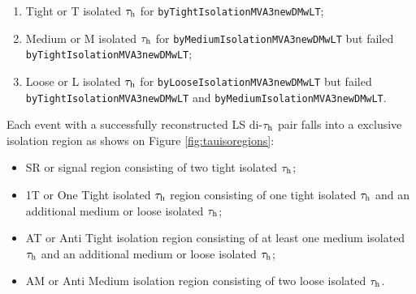  	
 	\begin{enumerate}
 		\item Tight or T isolated $\tau_{\text{h}}$ for \texttt{byTight\-IsolationMVA3newDMwLT};
 		\item Medium or M isolated $\tau_{\text{h}}$ for \texttt{byMedium\-IsolationMVA3newDMwLT} but failed \texttt{byTight\-IsolationMVA3newDMwLT};
 		\item Loose or L isolated $\tau_{\text{h}}$  for \texttt{byLoose\-IsolationMVA3newDMwLT} but failed \texttt{byTight\-IsolationMVA3newDMwLT} and \texttt{byMedium\-IsolationMVA3newDMwLT}.
 	\end{enumerate}
 	
Each event with a successfully reconstructed LS di-$\tau_{\text{h}}$ pair falls into a exclusive isolation region as shows on Figure \ref{fig:tauisoregions}:
 	
 	\begin{itemize}
 		\item SR or signal region consisting of two tight isolated $\tau_{\text{h}}$;
 		\item 1T or One Tight isolated $\tau_{\text{h}}$ region consisting of one tight isolated $\tau_{\text{h}}$ and an additional medium or loose isolated $\tau_{\text{h}}$;
 		\item AT or Anti Tight isolation region consisting of at least one medium isolated $\tau_{\text{h}}$ and an additional medium or loose isolated $\tau_{\text{h}}$;
 		\item AM or Anti Medium isolation region consisting of two loose isolated $\tau_{\text{h}}$.
 	\end{itemize}
 
